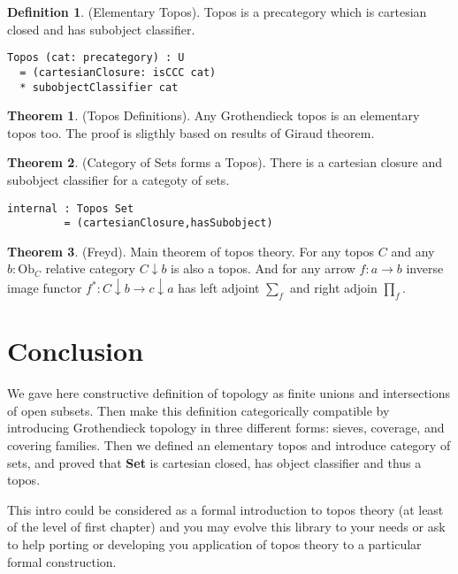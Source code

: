 \documentclass{article}
\theoremstyle{definition}
\newtheorem{definition}{Definition}
\newtheorem{theorem}{Theorem}
\begin{document}
\begin{definition} (Elementary Topos).
Topos is a precategory which is cartesian closed and has subobject classifier.
\begin{lstlisting}
Topos (cat: precategory) : U
  = (cartesianClosure: isCCC cat)
  * subobjectClassifier cat
\end{lstlisting}
\end{definition}

\begin{theorem} (Topos Definitions).
Any Grothendieck topos is an elementary topos too.
The proof is sligthly based on results of Giraud theorem.
\end{theorem}

\begin{theorem} (Category of Sets forms a Topos).
There is a cartesian closure and subobject classifier for a categoty of sets.
\begin{lstlisting}
internal : Topos Set
         = (cartesianClosure,hasSubobject)
\end{lstlisting}
\end{theorem}

\begin{theorem} (Freyd). Main theorem of topos theory\cite{Goldblatt14}.
For any topos $C$ and any $b : \mathrm{Ob}_C$ relative category $C\downarrow b$ is also a topos.
And for any arrow $f: a \rightarrow b$ inverse image functor $f^*: C\downarrow b \rightarrow c\downarrow a$
has left adjoint $\sum_f$ and right adjoin $\prod_f$.
\end{theorem}

\section*{Conclusion}

We gave here constructive definition of topology as finite unions and
intersections of open subsets. Then make this definition categorically
compatible by introducing Grothendieck topology in three different forms: sieves, coverage,
and covering families. Then we defined an elementary topos and introduce category of sets,
and proved that {\bf Set} is cartesian closed, has object classifier and thus a topos.

This intro could be considered as a formal introduction to topos theory (at least of the level of first chapter)
and you may evolve this library to your needs or ask to help porting or developing you application
of topos theory to a particular formal construction.



\end{document}
